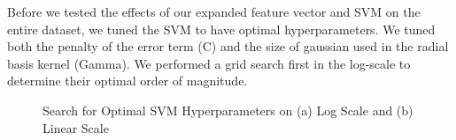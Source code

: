 Before we tested the effects of our expanded feature vector and SVM on the entire dataset, we tuned the SVM to have optimal hyperparameters. We tuned both the penalty of the error term (C) and the size of gaussian used in the radial basis kernel (Gamma). We performed a grid search first in the log-scale to determine their optimal order of magnitude.
%
\begin{figure}[htbp]%
  \centering
  \qquad
\caption{Search for Optimal SVM Hyperparameters on (a) Log Scale and (b) Linear Scale}%
\label{svmparameters}%
\end{figure}

